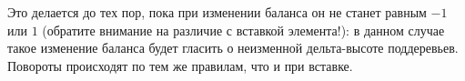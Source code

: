 \begin{frame}
    
    Это делается до тех пор, пока при изменении баланса он не станет равным $-1$ или $1$
    (обратите внимание на различие с вставкой элемента!):
    в данном случае такое изменение баланса будет гласить о неизменной дельта-высоте поддеревьев.
    Повороты происходят по тем же правилам, что и при вставке.

\end{frame}